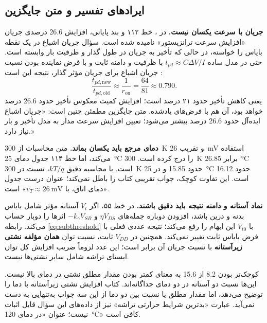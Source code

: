 \documentclass[12pt,a4paper]{article}
\newcommand{\reviewfile}[1]{\lr{\small\texttt{#1}}}
\begin{document}
\subsection*{ایرادهای تفسیر و متن جایگزین}
\textbf{جریان با سرعت یکسان نیست.} در \reviewfile{2/solutions/2-10.tex}، خط ۱۱۲ و بند پایانی، افزایش \num{26.6} درصدی جریان «افزایش سرعت ترانزیستور» نامیده شده است. سؤال جریان اشباع در یک نقطه بایاس را خواسته، در حالی که تأخیر به جریان در طول گذار و ظرفیت بار وابسته است. حتی در مدل ساده \(t_{pd}\approx C\Delta V/I\) با ظرفیت و دامنه ثابت و با فرض نماینده بودن نسبت جریان اشباع برای جریان مؤثر گذار، نتیجه این است \cite[اسلاید ۸]{mosfet}:
\begin{equation}
 \frac{t_{pd,\mathrm{new}}}{t_{pd,\mathrm{old}}}
 \approx\frac{1}{r_{\mathrm{on}}}=\frac{64}{81}\approx0.790.
 \label{eq:delay-ratio}
\end{equation}
یعنی کاهش تأخیر حدود ۲۱ درصد است؛ افزایش کمیت معکوس تأخیر حدود \num{26.6} درصد خواهد بود، آن هم با فرض‌های یادشده. متن جایگزین مطمئن چنین است: «جریان اشباع ایده‌آل حدود \num{26.6} درصد بیشتر می‌شود؛ تعیین افزایش سرعت مدار به مدل تأخیر و بار نیاز دارد.»

\textbf{دمای مرجع باید یکسان بماند.} متن محاسبات از \qty{300}{\kelvin} و تقریب \qty{26}{\milli\volt} استفاده می‌کند، اما خط ۱۱۴ جدول دمای \qty{25}{\degreeCelsius} را درج کرده است. \qty{300}{\kelvin} برابر \qty{26.85}{\degreeCelsius} است. با محاسبه دقیق \(kT/q\)، نسبت در \qty{300}{\kelvin} حدود \num{15.85} و در \qty{25}{\degreeCelsius} حدود \num{16.12} است. این تفاوت کوچک، جواب تقریبی کتاب را باطل نمی‌کند؛ عنوان درست جدول «دمای اتاق، با \(v_T\approx\qty{26}{\milli\volt}\)» است.

\textbf{نماد آستانه و دامنه نتیجه باید دقیق باشند.} در خط ۵۵، اگر \(V_t\) آستانه مؤثر شامل بایاس بدنه و درین باشد، افزودن دوباره جمله‌های \(\eta V_{DS}\) و \(-k_\gamma V_{SB}\) اثرها را دوبار حساب می‌کند. رابطه \eqref{eq:subthreshold} با \(V_{t0}\) این ابهام را رفع می‌کند؛ نتیجه عددی فعلی با فرض بایاس ثابت تغییر نمی‌کند. همچنین در \(V_{DD}\) ثابت، نسبت توان \textbf{همان مؤلفه نشتی زیرآستانه} با نسبت جریان آن برابر است؛ این عدد لزوماً ضریب افزایش کل توان ایستای تراشه شامل سایر نشتی‌ها نیست.

کوچک‌تر بودن \num{8.2} از \num{15.6} به معنای کمتر بودن مقدار مطلق نشتی در دمای بالا نیست. این‌ها نسبت دو آستانه در دو دمای جداگانه‌اند. کتاب افزایش نشتی زیرآستانه با دما را توضیح می‌دهد، اما مقدار مطلق یا نسبت بین دو دما از این سه جواب به‌تنهایی به دست نمی‌آید. عبارت «بدترین شرایط حرارتی تراشه» نیز از داده‌های این سؤال قابل اثبات نیست؛ عنوان «در دمای \qty{120}{\degreeCelsius}» کافی است.
\end{document}
